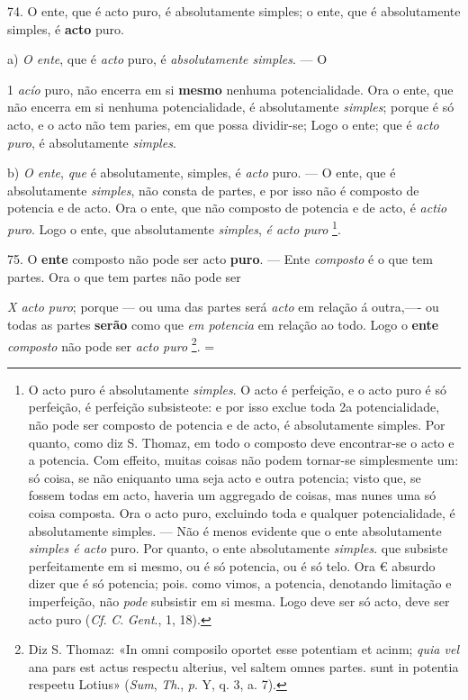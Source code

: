 74. O ente, que é acto puro, é absolutamente simples; o ente, que é absolutamente simples, é \textbf{acto} puro.

a) \emph{O ente}, que é \emph{acto} puro, é \emph{absolutamente simples}. --- O

1  \emph{acío} puro, não encerra em si \textbf{mesmo} nenhuma potencialidade. Ora o ente, que não encerra em si nenhuma potencialidade, é absolutamente \emph{simples}; porque é só acto, e o acto não tem paries, em que possa dividir-se; Logo o ente; que é \emph{acto puro}, é absolutamente \emph{simples}.

b) \emph{O ente}, \emph{que} é absolutamente, simples, é \emph{acto} puro. --- O ente, que é absolutamente \emph{simples}, não consta de partes, e por isso não é composto de potencia e de acto. Ora o ente, que não composto de potencia e de acto, é \emph{actio puro}. Logo o ente, que absolutamente \emph{simples}, \emph{é acto puro} \footnote{O acto puro é absolutamente \emph{simples}. O acto é perfeição, e o acto puro é só perfeição, é perfeição subsisteote: e por isso exclue toda 2a potencialidade, não pode ser composto de potencia e de acto, é absolutamente \textbar{} simples. Por quanto, como diz S. Thomaz, em todo o composto deve encontrar-se o acto e a potencia. Com effeito, muitas coisas não podem tornar-se simplesmente um: só coisa, se não eniquanto uma seja acto e outra potencia; visto que, se fossem todas em acto, haveria um aggregado de coisas, mas nunes uma só coisa composta. Ora o acto puro, excluindo toda e qualquer potencialidade, é absolutamente simples. --- Não é menos evidente que o ente absolutamente \emph{simples é acto} puro. Por quanto, o ente absolutamente \emph{simples}. que subsiste perfeitamente em si mesmo, ou é só potencia, ou é só telo. Ora € absurdo dizer que é só potencia; pois. como vimos, a potencia, denotando limitação e imperfeição, não \emph{pode} subsistir em si mesma. Logo deve ser só acto, deve ser acto puro (\emph{Cf}. \emph{C}. \emph{Gent}., 1, 18).}.

75. O \textbf{ente} composto não pode ser acto \textbf{puro}. --- Ente \emph{composto} é o que tem partes. Ora o que tem partes não pode ser

\emph{X acto puro}; porque --- ou uma das partes será \emph{acto} em relação á outra,---- ou todas as partes \textbf{serão} como que \emph{em potencia} em relação ao todo. Logo o \textbf{ente} \emph{composto} não pode ser \emph{acto puro} \footnote{Diz S. Thomaz: «In omni composilo oportet esse potentiam et acinm; \emph{quia vel} ana pars est actus respectu alterius, vel saltem omnes partes. sunt in potentia respeetu Lotius» (\emph{Sum}, \emph{Th}., \emph{p}. Y, q. 3, a. 7).}. =

